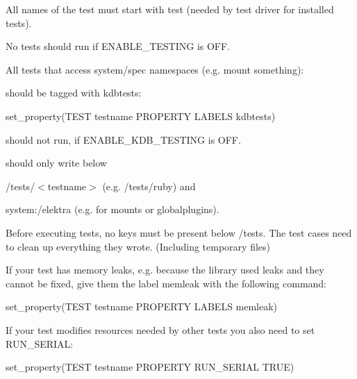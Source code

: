 \begin{DoxyItemize}
\item All names of the test must start with test (needed by test driver for installed tests).
\item No tests should run if E\+N\+A\+B\+L\+E\+\_\+\+T\+E\+S\+T\+I\+NG is O\+FF.
\item All tests that access system/spec namespaces (e.\+g. mount something)\+:
\item should be tagged with {\ttfamily kdbtests}\+:
\end{DoxyItemize}


\begin{DoxyCode}
set\_property(TEST testname PROPERTY LABELS kdbtests)
\end{DoxyCode}



\begin{DoxyItemize}
\item should not run, if {\ttfamily E\+N\+A\+B\+L\+E\+\_\+\+K\+D\+B\+\_\+\+T\+E\+S\+T\+I\+NG} is O\+FF.
\item should only write below
\begin{DoxyItemize}
\item {\ttfamily /tests/$<$testname$>$} (e.\+g. {\ttfamily /tests/ruby}) and
\item {\ttfamily system\+:/elektra} (e.\+g. for mounts or globalplugins).
\end{DoxyItemize}
\item Before executing tests, no keys must be present below {\ttfamily /tests}. The test cases need to clean up everything they wrote. (Including temporary files)
\item If your test has memory leaks, e.\+g. because the library used leaks and they cannot be fixed, give them the label {\ttfamily memleak} with the following command\+:
\end{DoxyItemize}


\begin{DoxyCode}
set\_property(TEST testname PROPERTY LABELS memleak)
\end{DoxyCode}



\begin{DoxyItemize}
\item If your test modifies resources needed by other tests you also need to set {\ttfamily R\+U\+N\+\_\+\+S\+E\+R\+I\+AL}\+:
\end{DoxyItemize}


\begin{DoxyCode}
set\_property(TEST testname PROPERTY RUN\_SERIAL TRUE)
\end{DoxyCode}


